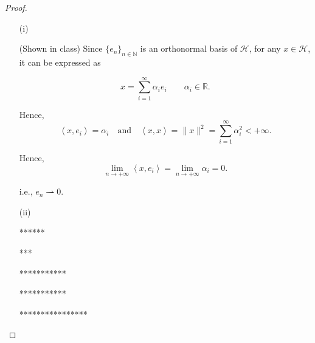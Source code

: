 \documentclass[12pt]{article}
\begin{document}
\begin{proof}

\begin{enumerate}
\item [(i)]

(Shown in class) Since $\{e_n\}_{n\in \mathbb N}$ is an orthonormal basis of $\mathcal H$, for any $x\in \mathcal H$, it can be expressed as

$$
x = \sum_{i=1}^\infty \alpha_i e_i \qquad \alpha_i \in \mathbb R.
$$

Hence, 
$$
\left\langle x, e_i  \right\rangle = \alpha_i \quad \text{and} \quad \left\langle x, x  \right\rangle = \|x\|^2 = \sum_{i=1}^\infty\alpha_i ^2 < +\infty.
$$

Hence, 
$$
\lim_{n\rightarrow +\infty} \left\langle x, e_i  \right\rangle = \lim_{n\rightarrow +\infty} \alpha_i = 0.
$$

i.e., $e_n \rightharpoonup 0$.




\item [(ii)]

******

***

***********

***********

****************

\end{enumerate}

\end{proof}
\end{document}
